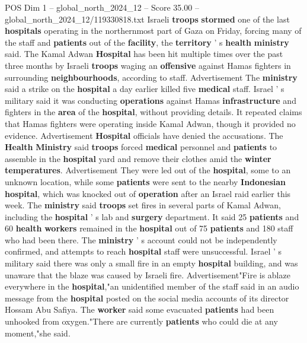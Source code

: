 \begin{textsample}{POS Dim 1 – global\_north\_2024\_12 – Score 35.00 – global\_north\_2024\_12/119330818.txt}  \label{ex:f1_pos_224}
Israeli \textbf{troops} \textbf{stormed} one of the last \textbf{hospitals} operating in the northernmost part of Gaza on Friday, forcing many of the staff and \textbf{patients} out of the \textbf{facility}, the \textbf{territory} ' s \textbf{health} \textbf{ministry} said.
The Kamal Adwan \textbf{Hospital} has been hit multiple times over the past three months by Israeli \textbf{troops} waging an \textbf{offensive} against Hamas fighters in surrounding \textbf{neighbourhoods}, according to staff.
Advertisement The \textbf{ministry} said a strike on the \textbf{hospital} a day earlier killed five \textbf{medical} staff.
Israel ' s military said it was conducting \textbf{operations} against Hamas \textbf{infrastructure} and fighters in the \textbf{area} of the \textbf{hospital}, without providing details.
It repeated claims that Hamas fighters were operating inside Kamal Adwan, though it provided no evidence.
Advertisement \textbf{Hospital} officials have denied the accusations.
The \textbf{Health} \textbf{Ministry} said \textbf{troops} forced \textbf{medical} personnel and \textbf{patients} to assemble in the \textbf{hospital} yard and remove their clothes amid the \textbf{winter} \textbf{temperatures}.
Advertisement They were led out of the \textbf{hospital}, some to an unknown location, while some \textbf{patients} were sent to the nearby \textbf{Indonesian} \textbf{hospital}, which was knocked out of \textbf{operation} after an Israel raid earlier this week.
The \textbf{ministry} said \textbf{troops} set fires in several parts of Kamal Adwan, including the \textbf{hospital} ' s lab and \textbf{surgery} department.
It said 25 \textbf{patients} and 60 \textbf{health} \textbf{workers} remained in the \textbf{hospital} out of 75 \textbf{patients} and 180 staff who had been there.
The \textbf{ministry} ' s account could not be independently confirmed, and attempts to reach \textbf{hospital} staff were unsuccessful.
Israel ' s military said there was only a small fire in an empty \textbf{hospital} building, and was unaware that the blaze was caused by Israeli fire.
Advertisement"Fire is ablaze everywhere in the \textbf{hospital},"an unidentified member of the staff said in an audio message from the \textbf{hospital} posted on the social media accounts of its director Hossam Abu Safiya.
The \textbf{worker} said some evacuated \textbf{patients} had been unhooked from oxygen."There are currently \textbf{patients} who could die at any moment,"she said.

\end{textsample}
